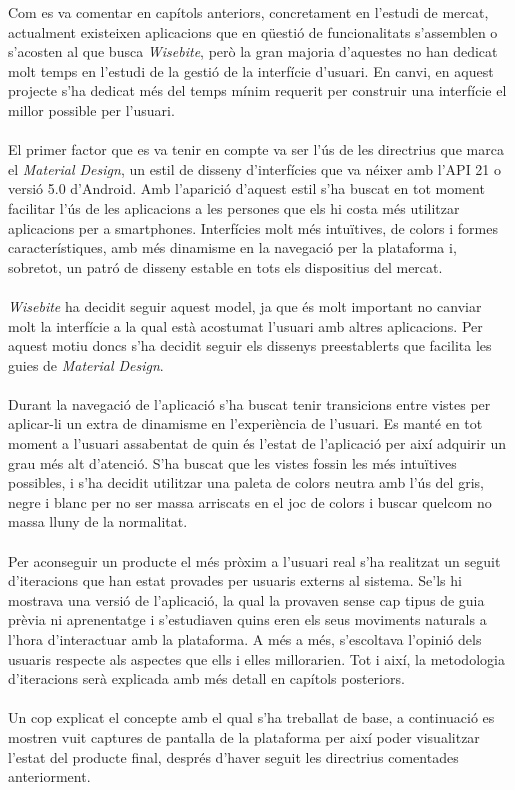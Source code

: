 Com es va comentar en capítols anteriors, concretament en l'estudi de mercat, actualment existeixen aplicacions que en qüestió de funcionalitats s'assemblen o s'acosten al que busca \textit{Wisebite}, però la gran majoria d'aquestes no han dedicat molt temps en l'estudi de la gestió de la interfície d'usuari. En canvi, en aquest projecte s'ha dedicat més del temps mínim requerit per construir una interfície el millor possible per l'usuari.
\\\\
El primer factor que es va tenir en compte va ser l'ús de les directrius que marca el \textit{Material Design}, un estil de disseny d'interfícies que va néixer amb l'API 21 o versió 5.0 d'Android. Amb l'aparició d'aquest estil s'ha buscat en tot moment facilitar l'ús de les aplicacions a les persones que els hi costa més utilitzar aplicacions per a smartphones. Interfícies molt més intuïtives, de colors i formes característiques, amb més dinamisme en la navegació per la plataforma i, sobretot, un patró de disseny estable en tots els dispositius del mercat.
\\\\
\textit{Wisebite} ha decidit seguir aquest model, ja que és molt important no canviar molt la interfície a la qual està acostumat l'usuari amb altres aplicacions. Per aquest motiu doncs s'ha decidit seguir els dissenys preestablerts que facilita les guies de \textit{Material Design}.
\\\\
Durant la navegació de l'aplicació s'ha buscat tenir transicions entre vistes per aplicar-li un extra de dinamisme en l'experiència de l'usuari. Es manté en tot moment a l'usuari assabentat de quin és l'estat de l'aplicació per així adquirir un grau més alt d'atenció. S'ha buscat que les vistes fossin les més intuïtives possibles, i s'ha decidit utilitzar una paleta de colors neutra amb l'ús del gris, negre i blanc per no ser massa arriscats en el joc de colors i buscar quelcom no massa lluny de la normalitat.
\\\\
Per aconseguir un producte el més pròxim a l'usuari real s'ha realitzat un seguit d'iteracions que han estat provades per usuaris externs al sistema. Se'ls hi mostrava una versió de l'aplicació, la qual la provaven sense cap tipus de guia prèvia ni aprenentatge i s'estudiaven quins eren els seus moviments naturals a l'hora d'interactuar amb la plataforma. A més a més, s'escoltava l'opinió dels usuaris respecte als aspectes que ells i elles millorarien. Tot i així, la metodologia d'iteracions serà explicada amb més detall en capítols posteriors.
\\\\
Un cop explicat el concepte amb el qual s'ha treballat de base, a continuació es mostren vuit captures de pantalla de la plataforma per així poder visualitzar l'estat del producte final, després d'haver seguit les directrius comentades anteriorment.

